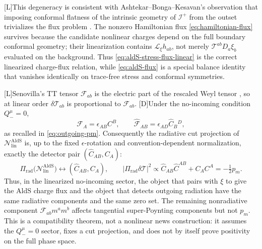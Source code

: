 \documentclass[11pt,a4paper]{article}
\newcommand{\cT}{\mathcal{T}}
\newcommand{\cN}{\mathcal{N}}
\newcommand{\statusL}{\textsf{[L]}}
\newcommand{\statusD}{\textsf{[D]}}
\begin{document}
\statusL This degeneracy is consistent with Ashtekar--Bonga--Kesavan's observation that imposing conformal flatness of the intrinsic geometry of \(\mathscr I^+\) from the outset trivializes the flux problem \cite{ashtekar2015linear}.  The nonzero Hamiltonian flux \eqref{eq:hamiltonian-flux} survives because the candidate nonlinear charges depend on the full boundary conformal geometry; their linearization contains \(\mathcal L_\xi h_{ab}\), not merely \(\cT^{ab}D_a\xi_b\) evaluated on the background.  Thus \eqref{eq:aldS-stress-flux-linear} is the correct linearized charge-flux relation, while \eqref{eq:aldS-flux} is a special balance identity that vanishes identically on trace-free stress and conformal symmetries.

\statusL Senovilla's TT tensor \(\mathcal F_{ab}\) is the electric part of the rescaled Weyl tensor \cite{senovilla2022radiation}, so at linear order \(\delta\cT_{ab}\) is proportional to \(\mathcal F_{ab}\).  \statusD Under the no-incoming condition \(Q_-^\mu=0\),
\begin{equation}
  \mathcal F_A=\epsilon_{AB}C^B,
  \qquad
  \hat{\mathcal F}_{AB}=\epsilon_{AD}\hat C_B{}^D ,
\end{equation}
as recalled in \eqref{eq:outgoing-pm}.  Consequently the radiative cut projection of \(\cN^{\mathrm{AldS}}_{\mathrm{lin}}\) is, up to the fixed \(\epsilon\)-rotation and convention-dependent normalization, exactly the detector pair \((\hat C_{AB},C_A)\):
\begin{equation}\label{eq:linear-news-detector-bridge}
  \Pi_{\mathrm{rad}}\big(\cN^{\mathrm{AldS}}_{\mathrm{lin}}\big)
  \longleftrightarrow
  (\hat C_{AB},C_A),
  \qquad
  \big|\Pi_{\mathrm{rad}}\delta\cT\big|^2
  \propto
  \hat C_{AB}\hat C^{AB}+C_AC^A
  =
  -\tfrac12 p_m .
\end{equation}
Thus, in the linearized no-incoming sector, the object that pairs with \(\xi\) to give the AldS charge flux and the object that detects outgoing radiation have the same radiative components and the same zero set.  The remaining nonradiative component \(\mathcal F_{ab}m^am^b\) affects tangential super-Poynting components but not \(p_m\).  This is a compatibility theorem, not a nonlinear news construction: it assumes the \(Q_-^\mu=0\) sector, fixes a cut projection, and does not by itself prove positivity on the full phase space.
\end{document}
